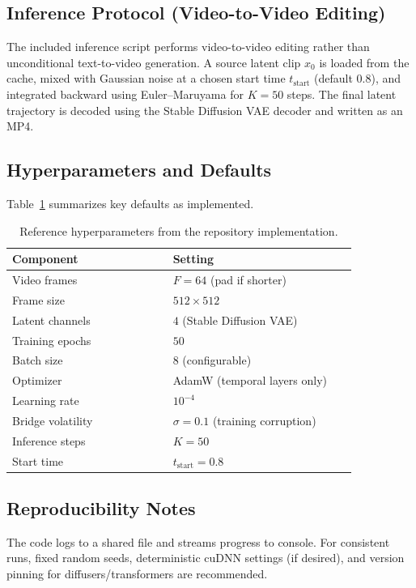 \documentclass[journal]{IEEEtran}
\begin{document}
\subsection{Inference Protocol (Video-to-Video Editing)}
The included inference script performs video-to-video editing rather than unconditional text-to-video generation. A source latent clip $x_0$ is loaded from the cache, mixed with Gaussian noise at a chosen start time $t_\mathrm{start}$ (default $0.8$), and integrated backward using Euler--Maruyama for $K=50$ steps. The final latent trajectory is decoded using the Stable Diffusion VAE decoder and written as an MP4.

\subsection{Hyperparameters and Defaults}
Table~\ref{tab:hyperparams} summarizes key defaults as implemented.

\begin{table}[t]
\caption{Reference hyperparameters from the repository implementation.}
\label{tab:hyperparams}
\centering
\begin{tabular}{@{}p{0.42\linewidth}p{0.48\linewidth}@{}}
\toprule
\textbf{Component} & \textbf{Setting} \\
\midrule
Video frames & $F=64$ (pad if shorter) \\
Frame size & $512\times512$ \\
Latent channels & $4$ (Stable Diffusion VAE) \\
Training epochs & $50$ \\
Batch size & $8$ (configurable) \\
Optimizer & AdamW (temporal layers only) \\
Learning rate & $10^{-4}$ \\
Bridge volatility & $\sigma=0.1$ (training corruption) \\
Inference steps & $K=50$ \\
Start time & $t_\mathrm{start}=0.8$ \\
\bottomrule
\end{tabular}
\end{table}

\subsection{Reproducibility Notes}
The code logs to a shared file and streams progress to console. For consistent runs, fixed random seeds, deterministic cuDNN settings (if desired), and version pinning for diffusers/transformers are recommended.
\end{document}
